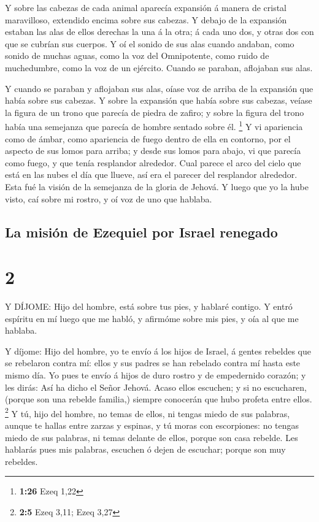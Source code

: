  Y sobre las cabezas de cada animal aparecía expansión á
manera de cristal maravilloso, extendido encima sobre sus cabezas.
 Y debajo de la expansión estaban las alas de ellos
derechas la una á la otra; á cada uno dos, y otras dos con que se
cubrían sus cuerpos.  Y oí el sonido de sus alas cuando
andaban, como sonido de muchas aguas, como la voz del Omnipotente, como
ruido de muchedumbre, como la voz de un ejército. Cuando se paraban,
aflojaban sus alas.

 Y cuando se paraban y aflojaban sus alas, oíase voz de
arriba de la expansión que había sobre sus cabezas.  Y
sobre la expansión que había sobre sus cabezas, veíase la figura de un
trono que parecía de piedra de zafiro; y sobre la figura del trono había
una semejanza que parecía de hombre sentado sobre él. \footnote{\textbf{1:26}
  Ezeq 1,22}  Y vi apariencia como de ámbar, como
apariencia de fuego dentro de ella en contorno, por el aspecto de sus
lomos para arriba; y desde sus lomos para abajo, vi que parecía como
fuego, y que tenía resplandor alrededor.  Cual parece el
arco del cielo que está en las nubes el día que llueve, así era el
parecer del resplandor alrededor. Esta fué la visión de la semejanza de
la gloria de Jehová. Y luego que yo la hube visto, caí sobre mi rostro,
y oí voz de uno que hablaba.

\hypertarget{la-misiuxf3n-de-ezequiel-por-israel-renegado}{%
\subsection{La misión de Ezequiel por Israel
renegado}\label{la-misiuxf3n-de-ezequiel-por-israel-renegado}}

\hypertarget{section-1}{%
\section{2}\label{section-1}}

 Y DÍJOME: Hijo del hombre, está sobre tus pies, y hablaré
contigo.  Y entró espíritu en mí luego que me habló, y
afirmóme sobre mis pies, y oía al que me hablaba.

 Y díjome: Hijo del hombre, yo te envío á los hijos de
Israel, á gentes rebeldes que se rebelaron contra mí: ellos y sus padres
se han rebelado contra mí hasta este mismo día.  Yo pues te
envío á hijos de duro rostro y de empedernido corazón; y les dirás: Así
ha dicho el Señor Jehová.  Acaso ellos escuchen; y si no
escucharen, (porque son una rebelde familia,) siempre conocerán que hubo
profeta entre ellos. \footnote{\textbf{2:5} Ezeq 3,11; Ezeq 3,27}
 Y tú, hijo del hombre, no temas de ellos, ni tengas miedo
de sus palabras, aunque te hallas entre zarzas y espinas, y tú moras con
escorpiones: no tengas miedo de sus palabras, ni temas delante de ellos,
porque son casa rebelde.  Les hablarás pues mis palabras,
escuchen ó dejen de escuchar; porque son muy rebeldes.

